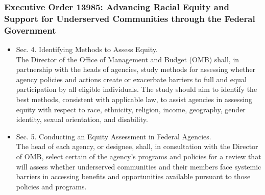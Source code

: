 \documentclass[handout]{beamer}
\begin{document}
\begin{frame}

  \frametitle{Executive Order 13985: {\small Advancing Racial Equity and Support for Underserved Communities through the Federal Government}}

  {\small\begin{itemize}
    \item \alert{Sec. 4.  Identifying Methods to Assess Equity}. \\ The
      Director of the Office of Management and Budget (OMB) shall, in
      partnership with the heads of agencies, study methods for
      assessing whether agency policies and actions create or
      exacerbate barriers to full and equal participation by all
      eligible individuals.  The study should aim to identify the best
      methods, consistent with applicable law, to assist agencies in
      assessing equity with respect to race, ethnicity, religion,
      income, geography, gender identity, sexual orientation, and
      disability.

    \vfill
  \item \alert{Sec. 5.  Conducting an Equity Assessment in Federal
      Agencies.} \\ The head of each agency, or designee, shall, in
    consultation with the Director of OMB, select certain of the
    agency's programs and policies for a review that will assess
    whether underserved communities and their members face systemic
    barriers in accessing benefits and opportunities available
    pursuant to those policies and programs.
  \end{itemize}}

\end{frame}
\end{document}
